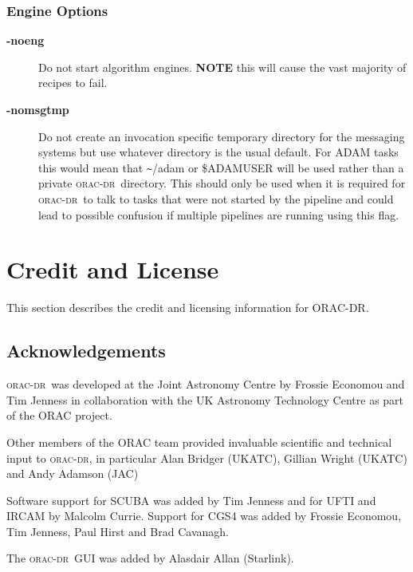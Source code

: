 \documentclass[twoside,11pt]{article}
\renewcommand{\_}{\texttt{\symbol{95}}}
\newcommand{\oracdr}{\textsc{orac-dr}}
\begin{document}
\subsubsection*{Engine Options\label{oracdr_Engine_Options}}
\begin{description}
\item[\textbf{-noeng}] \mbox{}

Do not start algorithm engines. \textbf{NOTE} this will cause
the vast majority of recipes to fail.

\item[\textbf{-nomsgtmp}] \mbox{}

Do not create an invocation specific temporary directory for the
messaging systems but use whatever directory is the usual default. For
ADAM tasks this would mean that \texttt{\~{}}/adam or \$ADAM\_USER will be used
rather than a private \oracdr\ directory. This should only be used when
it is required for \oracdr\ to talk to tasks that were not started by
the pipeline and could lead to possible confusion if multiple
pipelines are running using this flag.

\end{description}

\section{Credit and License\label{credit}}

This section describes the credit and licensing information for ORAC-DR.

\subsection*{Acknowledgements\label{ORAC-DR_Acknowledgements}}

\oracdr\ was developed at the Joint Astronomy Centre by
Frossie Economou and Tim Jenness in collaboration with the
UK Astronomy Technology Centre as part of the ORAC project.

Other members of the ORAC team provided invaluable scientific 
and technical input to \oracdr, in particular Alan Bridger (UKATC),
Gillian Wright (UKATC) and Andy Adamson (JAC)

Software support for SCUBA was added by Tim Jenness
and for UFTI and IRCAM by Malcolm Currie.
Support for CGS4 was added by Frossie Economou, Tim Jenness,
Paul Hirst and Brad Cavanagh.

The \oracdr\ GUI was added by Alasdair Allan (Starlink).
\end{document}
